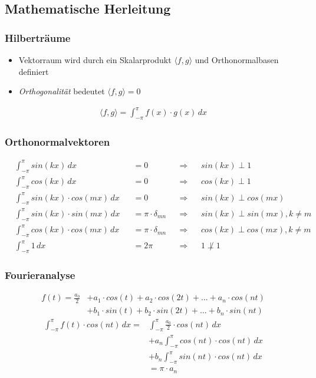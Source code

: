 \subsection{Mathematische Herleitung}
\begin{frame}
  \frametitle{Hilberträume}

  \begin{itemize}
    \item Vektorraum wird durch ein Skalarprodukt $ \langle f, g \rangle $ und Orthonormalbasen definiert
    \item \emph{Orthogonalität} bedeutet $\langle f, g \rangle = 0$
  \end{itemize}

  \begin{align*}
    \langle f, g \rangle = \int_{-\pi}^{\pi} f(x) \cdot g(x) \, dx
  \end{align*}
\end{frame}

\begin{frame}
  \frametitle{Orthonormalvektoren}

  \begin{align*}
    &\int_{-\pi}^{\pi} sin(k x) \, dx &&= 0 && \Rightarrow && sin(k x) \perp 1 \\
    &\int_{-\pi}^{\pi} cos(k x) \, dx &&= 0 && \Rightarrow && cos(k x) \perp 1 \\
    &\int_{-\pi}^{\pi} sin(k x)\cdot cos(m x) \, dx &&= 0 && \Rightarrow && sin(k x) \perp cos(m x) \\
    &\int_{-\pi}^{\pi} sin(k x)\cdot sin(m x) \, dx &&= \pi \cdot \delta_{m n} && \Rightarrow && sin(k x) \perp sin(m x), k \neq m \\
    &\int_{-\pi}^{\pi} cos(k x)\cdot cos(m x) \, dx &&= \pi \cdot \delta_{m n} && \Rightarrow && cos(k x) \perp cos(m x), k \neq m \\
    &\int_{-\pi}^{\pi} 1 \, dx &&= 2 \pi && \Rightarrow && 1 \not\perp 1
  \end{align*}
\end{frame}

\begin{frame}
  \frametitle{Fourieranalyse}

  \begin{align*}
    f(t) = \frac{a_0}{2} &+ a_1 \cdot cos(  t) + a_2 \cdot cos(2   t) + ... + a_n \cdot cos(n   t) \\ &+ b_1 \cdot sin( t) + b_2 \cdot sin(2  t) + ... + b_n \cdot sin(n  t)
   \end{align*}
   \begin{align*}
     \int_{-\pi}^{\pi} f(t) \cdot cos(n t) \, dx = &\int_{-\pi}^{\pi} \frac{a_0}{2} \cdot cos(n t) \,dx \\
      &+ a_n \int_{-\pi}^{\pi} cos(n  t) \cdot cos(n t) \, dx \\
      &+ b_n \int_{-\pi}^{\pi} sin(n  t) \cdot cos(n t) \, dx\\
      &= \pi \cdot a_n
    \end{align*}
\end{frame}
